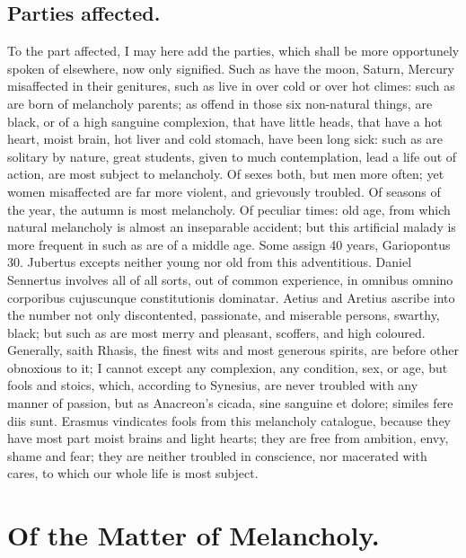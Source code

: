 {\subsection{Parties affected.}
To the part affected, I may here add the parties,
which shall be more opportunely spoken of elsewhere, now only
signified. Such as have the moon, Saturn, Mercury misaffected in their
genitures, such as live in over cold or over hot climes: such as are
born of melancholy parents; as offend in those six non-natural things,
are black, or of a high sanguine complexion, that have little
heads, that have a hot heart, moist brain, hot liver and cold stomach,
have been long sick: such as are solitary by nature, great students,
given to much contemplation, lead a life out of action, are most
subject to melancholy. Of sexes both, but men more often; yet
women misaffected are far more violent, and grievously troubled.
Of seasons of the year, the autumn is most melancholy. Of peculiar
times: old age, from which natural melancholy is almost an inseparable
accident; but this artificial malady is more frequent in such as are of
a middle age. Some assign 40 years, Gariopontus 30. Jubertus
excepts neither young nor old from this adventitious. Daniel Sennertus
involves all of all sorts, out of common experience, in omnibus
omnino corporibus cujuscunque constitutionis dominatar. Aetius and
Aretius ascribe into the number not only discontented,
passionate, and miserable persons, swarthy, black; but such as are most
merry and pleasant, scoffers, and high coloured. Generally, saith
Rhasis, the finest wits and most generous spirits, are before
other obnoxious to it; I cannot except any complexion, any condition,
sex, or age, but fools and stoics, which, according to
Synesius, are never troubled with any manner of passion, but as
Anacreon's cicada, sine sanguine et dolore; similes fere diis sunt.
Erasmus vindicates fools from this melancholy catalogue, because they
have most part moist brains and light hearts; they are free from
ambition, envy, shame and fear; they are neither troubled in
conscience, nor macerated with cares, to which our whole life is most
subject.

\section{Of the Matter of Melancholy.}

}
